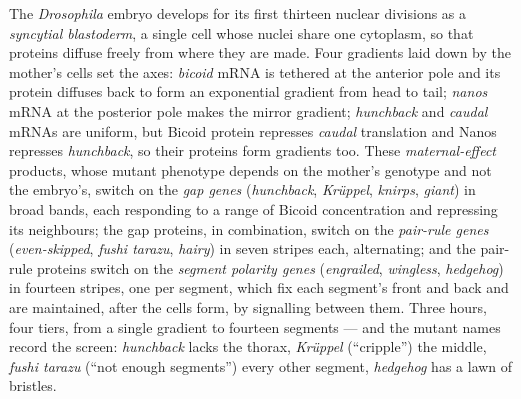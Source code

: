 \begin{definition}\label{def:b3:developmental-genetics:hierarchy}
The \emph{Drosophila} embryo develops for its first thirteen nuclear
divisions as a \emph{syncytial blastoderm}, a single cell whose nuclei
share one cytoplasm, so that proteins diffuse freely from where they are
made. Four gradients laid down by the mother's cells set the axes:
\emph{bicoid} mRNA is tethered at the anterior pole and its protein
diffuses back to form an exponential gradient from head to tail;
\emph{nanos} mRNA at the posterior pole makes the mirror gradient;
\emph{hunchback} and \emph{caudal} mRNAs are uniform, but Bicoid
protein represses \emph{caudal} translation and Nanos represses
\emph{hunchback}, so their proteins form gradients too. These
\emph{maternal-effect} products, whose mutant phenotype depends on the
mother's genotype and not the embryo's, switch on the \emph{gap genes}
(\emph{hunchback}, \emph{Krüppel}, \emph{knirps}, \emph{giant}) in
broad bands, each responding to a range of Bicoid concentration and
repressing its neighbours; the gap proteins, in combination, switch on
the \emph{pair-rule genes} (\emph{even-skipped}, \emph{fushi tarazu},
\emph{hairy}) in seven stripes each, alternating; and the pair-rule
proteins switch on the \emph{segment polarity genes} (\emph{engrailed},
\emph{wingless}, \emph{hedgehog}) in fourteen stripes, one per segment,
which fix each segment's front and back and are maintained, after the
cells form, by signalling between them. Three hours, four tiers, from a
single gradient to fourteen segments --- and the mutant names record
the screen: \emph{hunchback} lacks the thorax, \emph{Krüppel} (``cripple'')
the middle, \emph{fushi tarazu} (``not enough segments'') every other
segment, \emph{hedgehog} has a lawn of bristles.
\end{definition}

